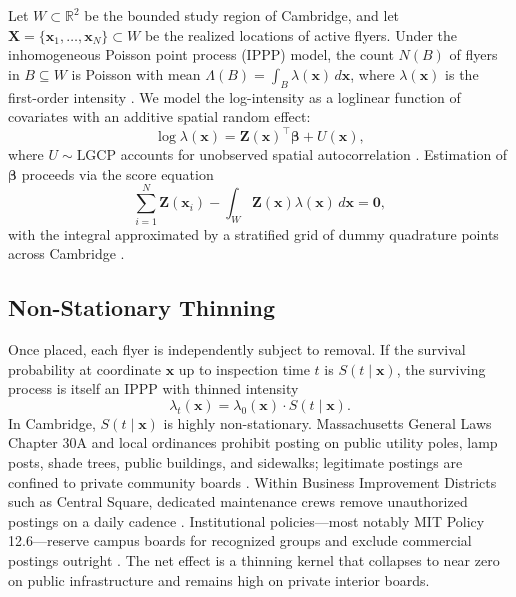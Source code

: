 \documentclass[sigconf,nonacm]{acmart}
\begin{document}
Let $W \subset \mathbb{R}^2$ be the bounded study region of Cambridge, and let $\mathbf{X} = \{\mathbf{x}_1, \dots, \mathbf{x}_N\} \subset W$ be the realized locations of active flyers. Under the inhomogeneous Poisson point process (IPPP) model, the count $N(B)$ of flyers in $B \subseteq W$ is Poisson with mean $\Lambda(B) = \int_B \lambda(\mathbf{x}) \, d\mathbf{x}$, where $\lambda(\mathbf{x})$ is the first-order intensity \cite{moraga, baddeley}. We model the log-intensity as a loglinear function of covariates with an additive spatial random effect:
\begin{equation}
    \log \lambda(\mathbf{x}) = \mathbf{Z}(\mathbf{x})^\top \boldsymbol{\beta} + U(\mathbf{x}),
\end{equation}
where $U \sim \text{LGCP}$ accounts for unobserved spatial autocorrelation \cite{bstpp, spatstat-poisson}. Estimation of $\boldsymbol{\beta}$ proceeds via the score equation
\begin{equation}
    \sum_{i=1}^N \mathbf{Z}(\mathbf{x}_i) - \int_W \mathbf{Z}(\mathbf{x}) \lambda(\mathbf{x}) \, d\mathbf{x} = \mathbf{0},
\end{equation}
with the integral approximated by a stratified grid of dummy quadrature points across Cambridge \cite{loh-yue}.

\subsection{Non-Stationary Thinning}

Once placed, each flyer is independently subject to removal. If the survival probability at coordinate $\mathbf{x}$ up to inspection time $t$ is $S(t \mid \mathbf{x})$, the surviving process is itself an IPPP with thinned intensity
\begin{equation}
    \lambda_t(\mathbf{x}) = \lambda_0(\mathbf{x}) \cdot S(t \mid \mathbf{x}).
\end{equation}
In Cambridge, $S(t \mid \mathbf{x})$ is highly non-stationary. Massachusetts General Laws Chapter 30A and local ordinances prohibit posting on public utility poles, lamp posts, shade trees, public buildings, and sidewalks; legitimate postings are confined to private community boards \cite{cambridge-redditB, duke-ordinances}. Within Business Improvement Districts such as Central Square, dedicated maintenance crews remove unauthorized postings on a daily cadence \cite{cambridge-redditA}. Institutional policies---most notably MIT Policy 12.6---reserve campus boards for recognized groups and exclude commercial postings outright \cite{mit-policy}. The net effect is a thinning kernel that collapses to near zero on public infrastructure and remains high on private interior boards.
\end{document}
